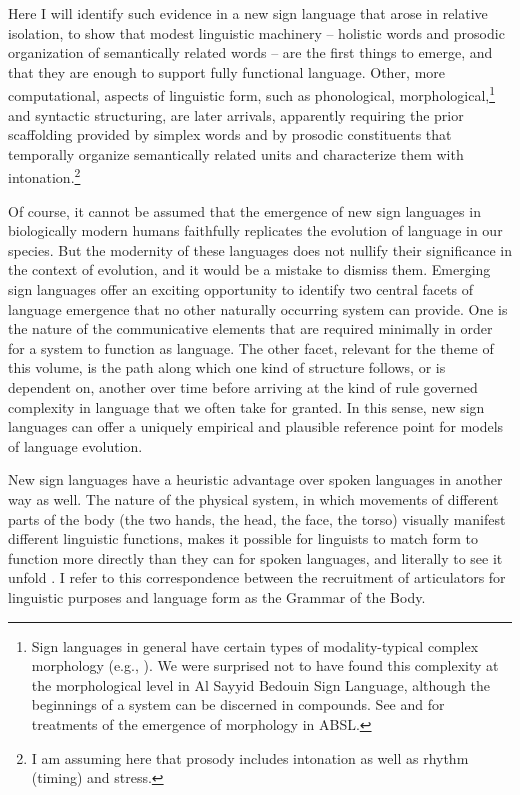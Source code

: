 \documentclass[output=paper]{langsci/langscibook}
\begin{document}
 Here I will identify such evidence in a new sign language that arose in relative isolation, to show that modest linguistic machinery – holistic words and prosodic organization of semantically related words – are the first things to emerge, and that they are enough to support fully functional language.  Other, more computational, aspects of linguistic form, such as phonological, morphological,\footnote{Sign languages in general have certain types of modality-typical complex morphology (e.g., \citealt{Aronoff2005}).  We were surprised not to have found this complexity at the morphological level in Al Sayyid Bedouin Sign Language, although the beginnings of a system can be discerned in compounds.  See \citet{Meir2010} and \citet{Padden2010} for treatments of the emergence of morphology in ABSL. } and syntactic structuring, are later arrivals, apparently requiring the prior scaffolding provided by simplex words and by prosodic constituents that temporally organize semantically related units and characterize them with intonation.\footnote{I am assuming here that prosody includes intonation as well as rhythm (timing) and stress.}  

  Of course, it cannot be assumed that the emergence of new sign languages in biologically modern humans faithfully replicates the evolution of language in our species.  But the modernity of these languages does not nullify their significance in the context of evolution, and it would be a mistake to dismiss them.  Emerging sign languages offer an exciting opportunity to identify two central facets of language emergence that no other naturally occurring system can provide.  One is the nature of the communicative elements that are required minimally in order for a system to function as language.  The other facet, relevant for the theme of this volume, is the path along which one kind of structure follows, or is dependent on, another over time before arriving at the kind of rule governed complexity in language that we often take for granted.  In this sense, new sign languages can offer a uniquely empirical and plausible reference point for models of language evolution.   

 New sign languages have a heuristic advantage over spoken languages in another way as well.  The nature of the physical system, in which movements of different parts of the body (the two hands, the head, the face, the torso) visually manifest different linguistic functions, makes it possible for linguists to match form to function more directly than they can for spoken languages, and literally to see it unfold \citep{Sandler2012a}.  I refer to this correspondence between the recruitment of articulators for linguistic purposes and language form as the Grammar of the Body. 
\end{document}
